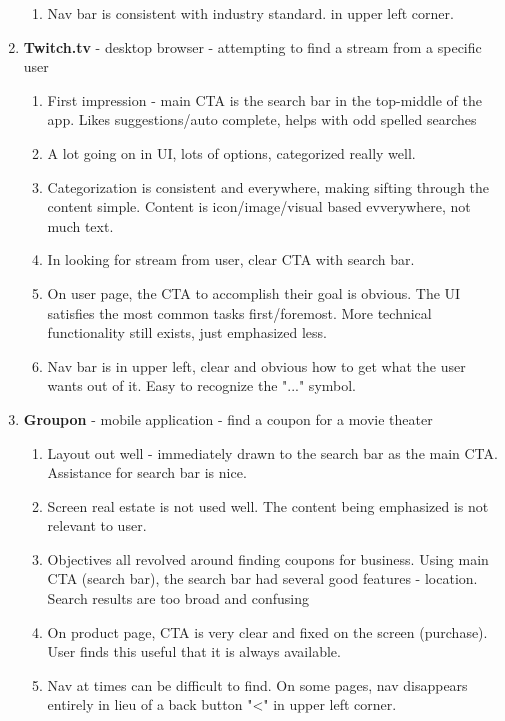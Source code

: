 \begin{enumerate}
\begin{enumerate}
  \item
    Nav bar is consistent with industry standard.  in upper left corner.
  \end{enumerate}
\item
  \textbf{Twitch.tv} - desktop browser - attempting to find a stream from a specific user
  \begin{enumerate}
  \item
    First impression - main CTA is the search bar in the top-middle of the app. Likes suggestions/auto complete, helps with odd spelled searches
  \item
    A lot going on in UI, lots of options, categorized really well.
  \item
    Categorization is consistent and everywhere, making sifting through the content simple. Content is icon/image/visual based evverywhere, not much text.
  \item
    In looking for stream from user, clear CTA with search bar.
  \item
    On user page, the CTA to accomplish their goal is obvious. The UI satisfies the most common tasks first/foremost. More technical functionality still exists, just emphasized less.
  \item
    Nav bar is in upper left, clear and obvious how to get what the user wants out of it. Easy to recognize the "..." symbol.
  \end{enumerate}
\item
  \textbf{Groupon} - mobile application - find a coupon for a movie theater
  \begin{enumerate}
  \item
    Layout out well - immediately drawn to the search bar as the main CTA. Assistance for search bar is nice.
  \item
    Screen real estate is not used well. The content being emphasized is not relevant to user.
  \item
    Objectives all revolved around finding coupons for business. Using main CTA (search bar), the search bar had several good features - location. Search results are too broad and confusing
  \item
    On product page, CTA is very clear and fixed on the screen (purchase). User finds this useful that it is always available.
  \item
    Nav at times can be difficult to find. On some pages, nav disappears entirely in lieu of a back button "<" in upper left corner.
  \end{enumerate}

\end{enumerate}
